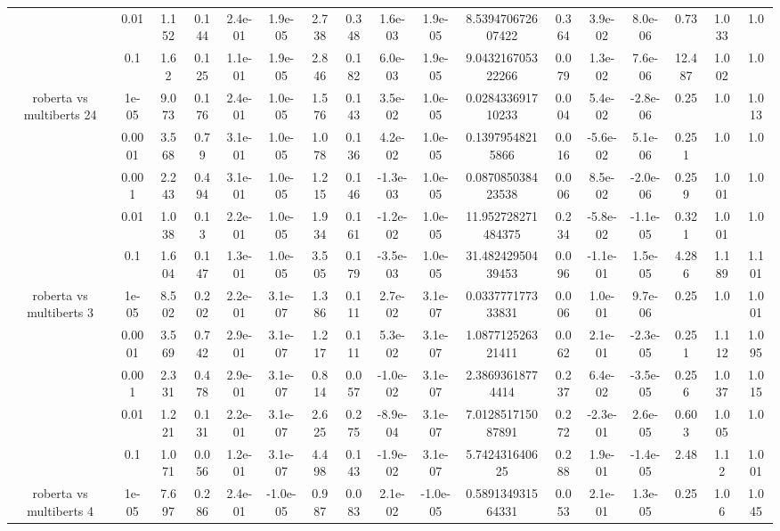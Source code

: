 \begin{tabular}{|c|c|c|c|c|c|c|c|c|c|c|c|c|c|c|c|c|}
 & 0.01 & 1.152 & 0.144 & 2.4e-01 & 1.9e-05 & 2.738 & 0.348 & 1.6e-03 & 1.9e-05 & 8.539470672607422 & 0.364 & 3.9e-02 & 8.0e-06 & 0.73 & 1.033 & 1.0 \\
 & 0.1 & 1.62 & 0.125 & 1.1e-01 & 1.9e-05 & 2.846 & 0.182 & 6.0e-03 & 1.9e-05 & 9.043216705322266 & 0.079 & 1.3e-02 & 7.6e-06 & 12.487 & 1.002 & 1.0 \\
\hline
\multirow{5}{*}{roberta  vs multiberts 24} & 1e-05 & 9.073 & 0.176 & 2.4e-01 & 1.0e-05 & 1.576 & 0.143 & 3.5e-02 & 1.0e-05 & 0.028433691710233 & 0.004 & 5.4e-02 & -2.8e-06 & 0.25 & 1.0 & 1.013 \\
 & 0.0001 & 3.568 & 0.79 & 3.1e-01 & 1.0e-05 & 1.078 & 0.136 & 4.2e-02 & 1.0e-05 & 0.13979548215866 & 0.016 & -5.6e-02 & 5.1e-06 & 0.251 & 1.0 & 1.0 \\
 & 0.001 & 2.243 & 0.494 & 3.1e-01 & 1.0e-05 & 1.215 & 0.146 & -1.3e-03 & 1.0e-05 & 0.087085038423538 & 0.006 & 8.5e-02 & -2.0e-06 & 0.259 & 1.001 & 1.0 \\
 & 0.01 & 1.038 & 0.13 & 2.2e-01 & 1.0e-05 & 1.934 & 0.161 & -1.2e-02 & 1.0e-05 & 11.952728271484375 & 0.234 & -5.8e-02 & -1.1e-05 & 0.321 & 1.001 & 1.0 \\
 & 0.1 & 1.604 & 0.147 & 1.3e-01 & 1.0e-05 & 3.505 & 0.179 & -3.5e-03 & 1.0e-05 & 31.48242950439453 & 0.096 & -1.1e-01 & 1.5e-05 & 4.286 & 1.189 & 1.101 \\
\hline
\multirow{5}{*}{roberta  vs multiberts 3} & 1e-05 & 8.502 & 0.202 & 2.2e-01 & 3.1e-07 & 1.386 & 0.111 & 2.7e-02 & 3.1e-07 & 0.033777177333831 & 0.006 & 1.0e-01 & 9.7e-06 & 0.25 & 1.0 & 1.001 \\
 & 0.0001 & 3.569 & 0.742 & 2.9e-01 & 3.1e-07 & 1.217 & 0.111 & 5.3e-02 & 3.1e-07 & 1.087712526321411 & 0.062 & 2.1e-01 & -2.3e-05 & 0.251 & 1.112 & 1.095 \\
 & 0.001 & 2.331 & 0.478 & 2.9e-01 & 3.1e-07 & 0.814 & 0.057 & -1.0e-02 & 3.1e-07 & 2.38693618774414 & 0.237 & 6.4e-02 & -3.5e-05 & 0.256 & 1.037 & 1.015 \\
 & 0.01 & 1.221 & 0.131 & 2.2e-01 & 3.1e-07 & 2.625 & 0.275 & -8.9e-04 & 3.1e-07 & 7.012851715087891 & 0.272 & -2.3e-01 & 2.6e-05 & 0.603 & 1.005 & 1.0 \\
 & 0.1 & 1.071 & 0.056 & 1.2e-01 & 3.1e-07 & 4.498 & 0.143 & -1.9e-02 & 3.1e-07 & 5.742431640625 & 0.288 & 1.9e-01 & -1.4e-05 & 2.48 & 1.12 & 1.001 \\
\hline
\multirow{5}{*}{roberta  vs multiberts 4} & 1e-05 & 7.697 & 0.286 & 2.4e-01 & -1.0e-05 & 0.987 & 0.083 & 2.1e-02 & -1.0e-05 & 0.589134931564331 & 0.053 & 2.1e-01 & 1.3e-05 & 0.25 & 1.06 & 1.045 \\

\end{tabular}

